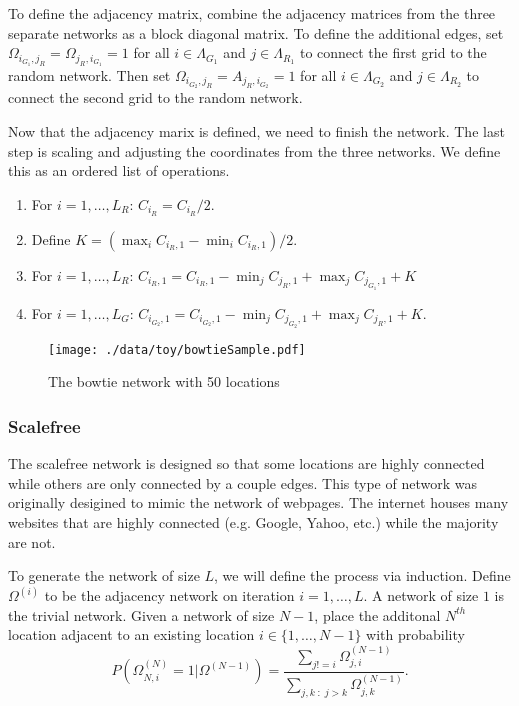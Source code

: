 \documentclass[11pt]{article}
\begin{document}
To define the adjacency matrix, combine the adjacency matrices from
the three separate networks as a block diagonal matrix.  To define the
additional edges, set $\Omega_{i_{G_1},j_R} = \Omega_{j_R,i_{G_1}} =
    1$ for all $i \in \Lambda_{G_1}$ and $j \in \Lambda_{R_1}$ to connect
the first grid to the random network.  Then set $\Omega_{i_{G_2},j_R}
    = A_{j_R,i_{G_2}} = 1$ for all $i \in \Lambda_{G_2}$ and $j \in
    \Lambda_{R_2}$ to connect the second grid to the random network.

Now that the adjacency marix is defined, we need to finish the
network.  The last step is scaling and adjusting the coordinates from
the three networks.  We define this as an ordered list of operations.
\begin{enumerate}
\item For $i=1,\ldots,L_R$: $C_{i_{R}} = C_{i_{R}}/2$.
\item Define $K = (\max_i C_{i_{R},1} - \min_i C_{i_{R},1})/2$.
\item For $i=1,\ldots,L_R$: $C_{i_{R},1} = C_{i_{R},1} -
\min_j C_{j_{R},1} + \max_j C_{j_{G_1},1} + K$
\item For $i=1,\ldots,L_G$:
$C_{i_{G_2},1} = C_{i_{G_2},1} - \min_j C_{j_{G_2},1} + \max_j
C_{j_{R},1} + K$.
\end{enumerate}


\begin{figure}[htb]
\centering
\texttt{[image: ./data/toy/bowtieSample.pdf]}
\caption{\label{fig:bowtie50}The bowtie network with 50 locations}
\end{figure}


\subsubsection{Scalefree}
\label{sec-3-1-6}

The scalefree network is designed so that some locations are highly
connected while others are only connected by a couple edges.  This
type of network was originally desigined to mimic the network of
webpages.  The internet houses many websites that are highly connected
(e.g. Google, Yahoo, etc.) while the majority are not.

To generate the network of size $L$, we will define the process via
induction.  Define $\Omega^{(i)}$ to be the adjacency network on
iteration $i = 1,\ldots,L$.  A network of size $1$ is the trivial
network.  Given a network of size $N-1$, place the additonal $N^{th}$
location adjacent to an existing location $i \in \lbrace
    1,\ldots,N-1\rbrace$ with probability
\begin{equation*}
P(\Omega^{(N)}_{N,i} = 1 | \Omega^{(N-1)}) = 
\frac{\sum_{j!=i} \Omega^{(N-1)}_{j,i}}{\sum_{j,k \;:\; j > k} \Omega^{(N-1)}_{j,k}}.
\end{equation*}
\end{document}
